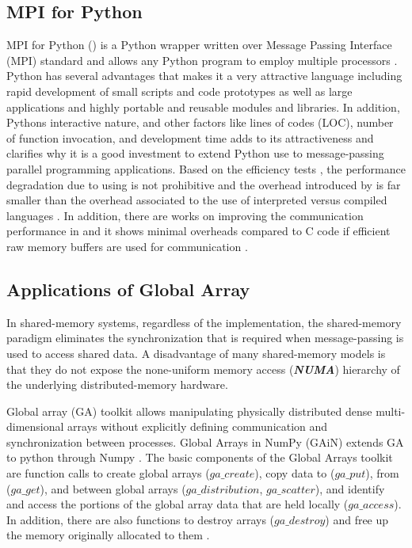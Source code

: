 \subsection{MPI for Python }
MPI for Python () is a Python wrapper written over Message Passing Interface (MPI) standard and allows any Python program to employ multiple processors \cite{Dalcin:2011aa, Dalcin:2005aa}.
Python has several advantages that makes it a very attractive language including rapid development of small scripts and code prototypes as well as large applications and highly portable and reusable modules and libraries.
In addition, Python\textsc{}s interactive nature, and other factors like lines of codes (LOC), number of function invocation, and development time adds to its attractiveness and clarifies why it is a good investment to extend Python use to message-passing parallel programming applications.
Based on the efficiency tests \cite{Dalcin:2011aa, Dalcin:2005aa}, the performance degradation due to using  is not prohibitive and the overhead introduced by  is far smaller than the overhead associated to the use of interpreted versus compiled languages \cite{GAiN}.
In addition, there are works on improving the communication performance in  and it shows minimal overheads compared to C code if efficient raw memory buffers are used for communication \cite{Dalcin:2011aa}.

\subsection{Applications of Global Array}
In shared-memory systems, regardless of the implementation, the shared-memory paradigm eliminates the synchronization that is required when message-passing is used to access shared data. 
A disadvantage of many shared-memory models is that they do not expose the none-uniform memory access (\textbf{\textit{NUMA}}) hierarchy of the underlying distributed-memory hardware. 

Global array (GA) toolkit allows manipulating physically distributed dense multi-dimensional arrays without explicitly defining communication and synchronization between processes.
Global Arrays in NumPy (GAiN) extends GA to python through Numpy \cite{GAiN}. 
The basic components of the Global Arrays toolkit are function calls to create global arrays ($ga\_create$), copy data to ($ga\_put$), from ($ga\_get$), and between global arrays ($ga\_distribution$, $ga\_scatter$), and identify and access the portions of the global array data that are held locally ($ga\_access$). 
In addition, there are also functions to destroy arrays ($ga\_destroy$) and free up the memory originally allocated to them \cite{GAiN}.

